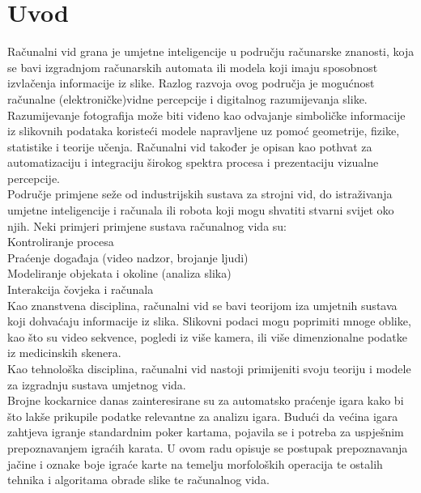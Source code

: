 \documentclass[times, zavrsni, numeric, utf8]{fer}
\begin{document}
\chapter{Uvod}
\label{chap:intro}
\hspace*{0.5cm}Računalni vid grana je umjetne inteligencije u području računarske znanosti, koja se bavi izgradnjom računarskih automata ili modela koji imaju sposobnost izvlačenja informacije iz slike. Razlog razvoja ovog područja je mogućnost računalne (elektroničke)vidne percepcije i digitalnog razumijevanja slike. Razumijevanje fotografija može biti viđeno kao odvajanje simboličke informacije iz slikovnih podataka koristeći modele napravljene uz pomoć geometrije, fizike, statistike i teorije učenja. Računalni vid također je opisan kao pothvat za automatizaciju i integraciju širokog spektra procesa i prezentaciju vizualne percepcije.\\
Područje primjene seže od industrijskih sustava za strojni vid, do istraživanja umjetne inteligencije i računala ili robota koji mogu shvatiti stvarni svijet oko njih. Neki primjeri primjene sustava računalnog vida su: \\
\hspace*{0.5cm}\textbullet{} Kontroliranje procesa \\
\hspace*{0.5cm}\textbullet{} Praćenje događaja (video nadzor, brojanje ljudi) \\
\hspace*{0.5cm}\textbullet{} Modeliranje objekata i okoline (analiza slika) \\
\hspace*{0.5cm}\textbullet{} Interakcija čovjeka i računala \\
\hspace*{0.5cm}Kao znanstvena disciplina, računalni vid se bavi teorijom iza umjetnih sustava koji dohvaćaju informacije iz slika. Slikovni podaci mogu poprimiti mnoge oblike, kao što su video sekvence, pogledi iz više kamera, ili više dimenzionalne podatke iz medicinskih skenera. \\
\hspace*{0.5cm}Kao tehnološka disciplina, računalni vid nastoji primijeniti svoju teoriju i modele za izgradnju sustava umjetnog vida.\\
\hspace*{0.5cm}Brojne kockarnice danas zainteresirane su za automatsko praćenje igara kako bi što lakše prikupile podatke relevantne za analizu igara. Budući da većina igara zahtjeva igranje standardnim poker kartama, pojavila se i potreba za uspješnim prepoznavanjem igraćih karata.
U ovom radu opisuje se postupak prepoznavanja jačine i oznake boje igraće karte na temelju morfoloških operacija te ostalih tehnika i algoritama obrade slike te računalnog vida.
\end{document}
